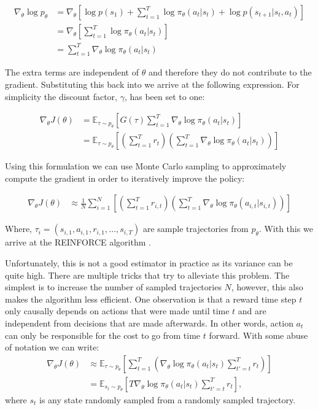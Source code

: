 \begin{align}
    \nabla_\theta \log p_\theta &= \nabla_\theta \left[ \log p(s_1) + \sum_{t=1}^T \log \pi_\theta(a_t|s_t) + \log p(s_{t+1} | s_t, a_t) \right]\\
    &= \nabla_\theta \left[ \sum_{t=1}^T \log \pi_\theta(a_t|s_t) \right]\\
    &= \sum_{t=1}^T \nabla_\theta \log \pi_\theta(a_t|s_t)
\end{align}

The extra terms are independent of $\theta$ and therefore they do not contribute to the gradient. Substituting this back into  we arrive at the following expression. For simplicity the discount factor, $\gamma$, has been set to one:

\begin{align}
    \nabla_\theta J(\theta) &= \mathbb{E}_{\tau \sim p_\theta} \left[ G(\tau) \sum_{t=1}^T \nabla_\theta \log \pi_\theta(a_t|s_t) \right]\\
    &= \mathbb{E}_{\tau \sim p_\theta} \left[ \left( \sum_{t=1}^T r_t \right) \left( \sum_{t=1}^T \nabla_\theta \log \pi_\theta(a_t|s_t) \right) \right]
\end{align}

Using this formulation we can use Monte Carlo sampling \cite{SHAPIRO2003353} to approximately compute the gradient in order to iteratively improve the policy:


\begin{align}
    \nabla_\theta J(\theta) &\approx \frac{1}{N} \sum_{i=1}^{N} \left[ \left( \sum_{t=1}^T r_{i,t} \right) \left( \sum_{t=1}^T \nabla_\theta \log \pi_\theta(a_{i,t}|s_{i,t}) \right) \right]
\end{align}

Where, $\tau_i = (s_{i,1}, a_{i,1}, r_{i,1}, \dots, s_{i,T})$ are sample trajectories from $p_\theta$. With this we arrive at the REINFORCE algorithm \cite{williams1992simple}.

Unfortunately, this is not a good estimator in practice as its variance can be quite high. There are multiple tricks that try to alleviate this problem. The simplest is to increase the number of sampled trajectories $N$, however, this also makes the algorithm less efficient. One observation is that a reward time step $t$ only causally depends on actions that were made until time $t$ and are independent from decisions that are made afterwards. In other words, action $a_t$ can only be responsible for the cost to go from time $t$ forward. With some abuse of notation we can write:
\begin{align}
    \nabla_\theta J(\theta) &\approx \mathbb{E}_{\tau \sim p_\theta} \left[ \sum_{t=1}^T \left( \nabla_\theta \log \pi_\theta(a_t|s_t)  \sum_{t'=t}^T r_t \right) \right]\\
    &= \mathbb{E}_{s_t \sim p_\theta} \left[T \nabla_\theta \log \pi_\theta(a_t|s_t)  \sum_{t'=t}^T r_t \right],
\end{align}
where $s_t$ is any state randomly sampled from a randomly sampled trajectory.


